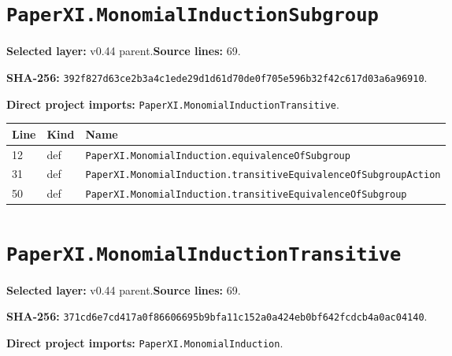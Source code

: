 \documentclass[10pt,oneside]{book}
\begin{document}
\section{\texorpdfstring{\nolinkurl{PaperXI.MonomialInductionSubgroup}}{PaperXI.MonomialInductionSubgroup}}\label{module:PaperXI.MonomialInductionSubgroup}

\textbf{Selected layer:} v0.44 parent.\quad\textbf{Source lines:} 69.\par\textbf{SHA-256:} {\scriptsize\nolinkurl{392f827d63ce2b3a4c1ede29d1d61d70de0f705e596b32f42c617d03a6a96910}}.


\textbf{Direct project imports:} \nolinkurl{PaperXI.MonomialInductionTransitive}.

\begin{longtable}{@{}p{}p{}p{}@{}}\toprule Line&Kind&Name\\\midrule\endhead

12&def&\nolinkurl{PaperXI.MonomialInduction.equivalenceOfSubgroup}\\

31&def&\nolinkurl{PaperXI.MonomialInduction.transitiveEquivalenceOfSubgroupAction}\\

50&def&\nolinkurl{PaperXI.MonomialInduction.transitiveEquivalenceOfSubgroup}\\

\bottomrule\end{longtable}

\section{\texorpdfstring{\nolinkurl{PaperXI.MonomialInductionTransitive}}{PaperXI.MonomialInductionTransitive}}\label{module:PaperXI.MonomialInductionTransitive}

\textbf{Selected layer:} v0.44 parent.\quad\textbf{Source lines:} 69.\par\textbf{SHA-256:} {\scriptsize\nolinkurl{371cd6e7cd417a0f86606695b9bfa11c152a0a424eb0bf642fcdcb4a0ac04140}}.


\textbf{Direct project imports:} \nolinkurl{PaperXI.MonomialInduction}.
\end{document}

